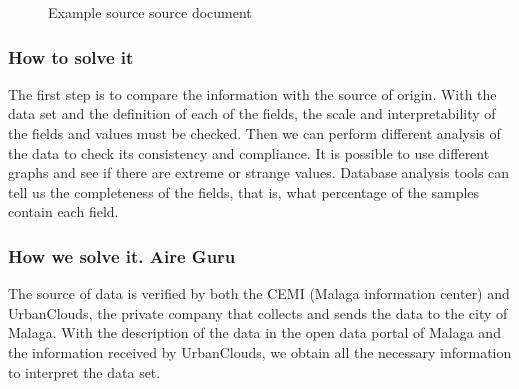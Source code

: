 \begin{figure}[ht]
\centering
{}
\caption{Example source source document}
\end{figure}

\subsubsection{How to solve it} 
The first step is to compare the information with the source of origin. With the data set and the definition
of each of the fields, the scale and interpretability of the fields and values must be checked.
Then we can perform different analysis of the data to check its consistency and compliance.
It is possible to use different graphs and see if there are extreme or strange values.
Database analysis tools can tell us the completeness of the fields, that is, what percentage of the
samples contain each field.

\subsubsection{How we solve it. Aire Guru} 
The source of data is verified by both the CEMI (Malaga information center) and UrbanClouds, the private company
that collects and sends the data to the city of Malaga.
With the description of the data in the open data portal of Malaga and the information received by UrbanClouds,
we obtain all the necessary information to interpret the data set. \\

